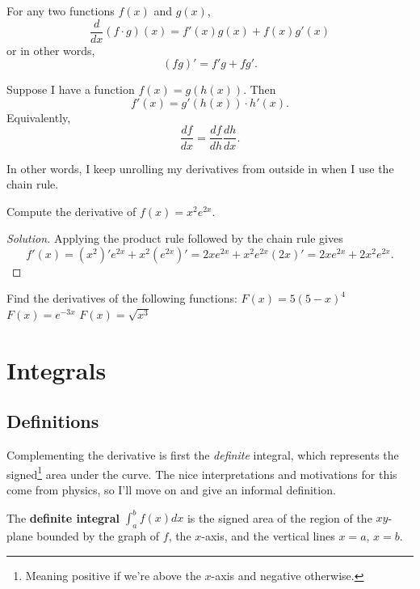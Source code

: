 \documentclass[11 pt]{scrartcl}
\begin{document}
\begin{lemma}
    For any two functions $f(x)$ and $g(x)$,
    \[ \dfrac{d}{dx} (f\cdot g)(x) = f'(x) g(x) + f(x)g'(x) \] 
    or in other words, 
    \[ (fg)' = f'g + fg'.\]
\end{lemma}

\begin{lemma}
    Suppose I have a function $f(x) = g(h(x))$. Then 
    \[ f'(x) = g'(h(x))\cdot h'(x).\] 
    Equivalently, 
    \[ \dfrac{df}{dx} = \dfrac{df}{dh} \dfrac{dh}{dx}.\] 
\end{lemma}

In other words, I keep unrolling my derivatives from outside in when I use the chain rule. 

\begin{example}
    Compute the derivative of $f(x) = x^2e^{2x}$.  
\end{example}
\begin{proof}[Solution]
    Applying the product rule followed by the chain rule gives 
    \[ f'(x) = (x^2)'e^{2x} + x^2 (e^{2x})' = 2xe^{2x} + x^2 e^{2x} (2x)' = 2xe^{2x} + 2x^2e^{2x}.\] 
\end{proof}

\begin{exercise}
    Find the derivatives of the following functions: 
    \alphanum
        \ii $F(x) = 5(5-x)^4$
        \ii $F(x) = e^{-3x}$
        \ii $F(x) = \sqrt{x^3}$
    \enumend
\end{exercise}

\section{Integrals}
\subsection{Definitions}
Complementing the derivative is first the \emph{definite} integral, which represents the signed\footnote{Meaning positive if we're above the $x$-axis and negative otherwise.} area under the curve. The nice interpretations and motivations for this come from physics, so I'll move on and give an informal definition. 

\begin{definition}
    The \textbf{definite integral} $\int_a^b f(x) dx$ is the signed area of the region of the $xy$-plane bounded by the graph of $f$, the $x$-axis, and the vertical lines $x = a$, $x = b$.   
\end{definition}
\end{document}
